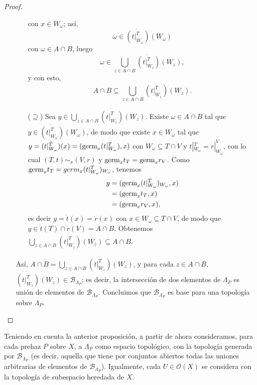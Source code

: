 \begin{proof}
\begin{itemize}
\begin{itemize}
$$            $$
            con $x\in W_{\omega}$; así, 
            $$
               \omega\in\dot{(t|^{T}_{W_\omega})}(W_\omega)
            $$
            con $\omega\in A\cap B$, luego
            $$
               \omega\in\bigcup_{z\in A\cap B}\dot{(t|^{T}_{W_z})}(W_z),
            $$
            y con esto,
            $$
            A\cap B\subseteq\bigcup_{z\in A\cap B}\dot{(t|^{T}_{W_z})}(W_z).
            $$
         \item[($\supseteq$)] Sea $y\in \bigcup_{z\in A\cap B}\dot{(t|^{T}_{W_z})}(W_z)$. Existe $\omega\in A\cap B$ tal que $y\in\dot{(t|^{T}_{W_\omega})}(W_\omega)$, de modo que existe $x\in W_{\omega}$ tal que $y=\dot{(t|^{T}_{W_\omega})}(x)=(\normalfont{\text{germ}}_{x}(t|^{T}_{W_\omega}),x)$ con $W_\omega\subseteq T\cap V$ y $t|^{T}_{W_\omega}=r|^{V}_{W_\omega}$, con lo cual $(T,t)\sim_{x}(V,r)$ y $\normalfont{\text{germ}}_{x}t_{T}=\normalfont{\text{germ}}_{x}r_{V}$. Como $\normalfont{\text{germ}}_{x}t_{T}=germ_{x}(t|^{T}_{W_\omega})_{W_\omega}$, tenemos
            $$
            \begin{aligned}
               y&=(\normalfont{\text{germ}}_{x}(t|^{T}_{W_\omega})_{W_\omega},x)\\
                &=(\normalfont{\text{germ}}_{x}t_{T},x)\\
                &=(\normalfont{\text{germ}}_{x}r_{V},x),
            \end{aligned}
            $$
            es decir $y=\dot{t}(x)=\dot{r}(x)$ con $x\in W_{\omega}\subseteq T\cap V$, de modo que $y\in\dot{t}(T)\cap\dot{r}(V)=A\cap B$. Obtenemos $\bigcup_{z\in A\cap B}\dot{(t|^{T}_{W_z})}(W_z)\subseteq A\cap B$.
      \end{itemize}
      Así, $A\cap B=\bigcup_{z\in A\cap B}\dot{(t|^{T}_{W_z})}(W_z)$, y para cada $z\in A\cap B$, $\dot{(t|^{T}_{W_z})}(W_z)\in\mathcal{B}_{\Lambda_P}$; es decir, la intersección de dos elementos de $\Lambda_P$ es unión de elementos de $\mathcal{B}_{\Lambda_P}$. Concluimos que $\mathcal{B}_{\Lambda_P}$ es base para una topología sobre $\Lambda_P$.
   \end{itemize}
\end{proof}
Teniendo en cuenta la anterior proposición, a partir de ahora consideramos, para cada prehaz $P$ sobre $X$, a $\Lambda_P$ como espacio topológico, con la topología generada por $\mathcal{B}_{\Lambda_{P}}$ (es decir, aquella que tiene por conjuntos abiertos todas las uniones arbitrarias de elementos de $\mathcal{B}_{\Lambda_P}$). Igualmente, cada $U\in\mathcal{O}(X)$ se considera con la topología de subespacio heredada de $X$.

